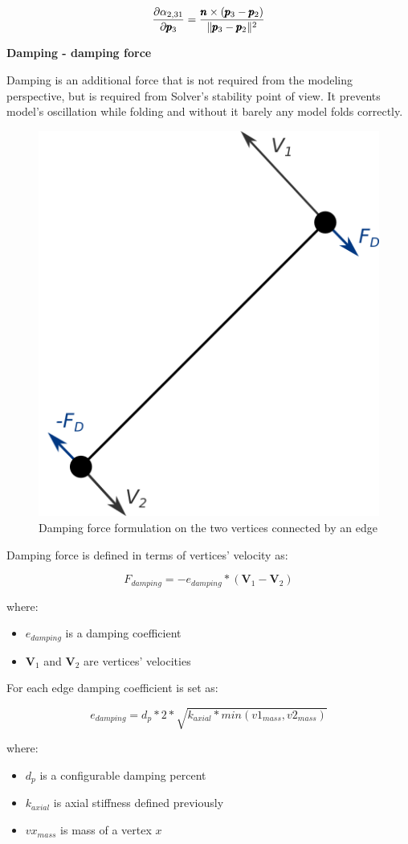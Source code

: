 \begin{equation} \label{Solver:face_force3}
	\frac{\partial \alpha _{2,31}}{\partial \pmb{p}_3} = \frac{\pmb{n} \times (\pmb{p}_3 - \pmb{p}_2)}{\|\pmb{p}_3 - \pmb{p}_2\|^2}
\end{equation}


\medskip
\textbf{Damping - damping force}
\smallskip

Damping is an additional force that is not required from the modeling perspective,
but is required from Solver's stability point of view. It prevents model's
oscillation while folding and without it barely any model folds correctly.

\begin{figure}[H]
	\caption{Damping force formulation on the two vertices connected by an edge}
    \centering
	\includegraphics[width=.3\linewidth]{assets/3-damping_force_edge.png}
\end{figure}

Damping force is defined in terms of vertices' velocity as:


$$F_{damping} = -e_{damping} * (\pmb{V}_1 - \pmb{V}_2)$$

where:

\begin{itemize}
	\item $e_{damping}$ is a damping coefficient 
	\item $\pmb{V}_1$ and $\pmb{V}_2$ are vertices' velocities
\end{itemize}

For each edge damping coefficient is set as:

$$ e_{damping} = d_p * 2 * \sqrt{k_{axial} * min(v1_{mass}, v2_{mass})} $$

where:

\begin{itemize}
	\item $d_p$ is a configurable damping percent
	\item $k_{axial}$ is axial stiffness defined previously
	\item $vx_{mass}$ is mass of a vertex $x$
\end{itemize}

